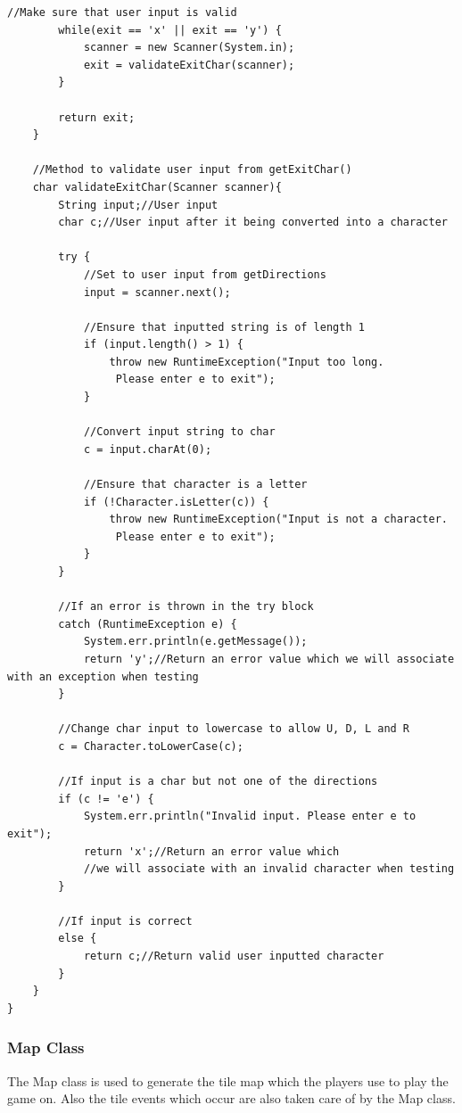 \documentclass[a4paper,12pt]{extarticle}
\begin{document}
\begin{lstlisting}[caption=The initial code of the Game class, label=amb]
        //Make sure that user input is valid
        while(exit == 'x' || exit == 'y') {
            scanner = new Scanner(System.in);
            exit = validateExitChar(scanner);
        }

        return exit;
    }

    //Method to validate user input from getExitChar()
    char validateExitChar(Scanner scanner){
        String input;//User input
        char c;//User input after it being converted into a character

        try {
            //Set to user input from getDirections
            input = scanner.next();

            //Ensure that inputted string is of length 1
            if (input.length() > 1) {
                throw new RuntimeException("Input too long.
                 Please enter e to exit");
            }

            //Convert input string to char
            c = input.charAt(0);

            //Ensure that character is a letter
            if (!Character.isLetter(c)) {
                throw new RuntimeException("Input is not a character.
                 Please enter e to exit");
            }
        }

        //If an error is thrown in the try block
        catch (RuntimeException e) {
            System.err.println(e.getMessage());
            return 'y';//Return an error value which we will associate with an exception when testing
        }

        //Change char input to lowercase to allow U, D, L and R
        c = Character.toLowerCase(c);

        //If input is a char but not one of the directions
        if (c != 'e') {
            System.err.println("Invalid input. Please enter e to exit");
            return 'x';//Return an error value which 
            //we will associate with an invalid character when testing
        }

        //If input is correct
        else {
            return c;//Return valid user inputted character
        }
    }
}
\end{lstlisting}

\subsubsection{Map Class}
The Map class is used to generate the tile map which the players use to play the game on. Also the tile events which occur are also taken care of by the Map class.
\end{document}
